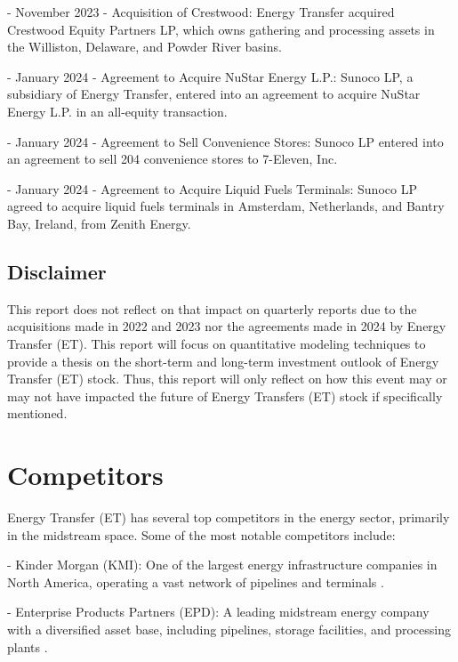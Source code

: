 \documentclass[9pt,a4paper,twoside]{tau}
\begin{document}
    - November 2023 - Acquisition of Crestwood: Energy Transfer acquired Crestwood Equity Partners LP, which owns gathering and processing assets in the Williston, Delaware, and Powder River basins\cite{energy-transfer-2024}.
    
    - January 2024 - Agreement to Acquire NuStar Energy L.P.: Sunoco LP, a subsidiary of Energy Transfer, entered into an agreement to acquire NuStar Energy L.P. in an all-equity transaction\cite{energy-transfer-2024}.
    
    - January 2024 - Agreement to Sell Convenience Stores: Sunoco LP entered into an agreement to sell 204 convenience stores to 7-Eleven, Inc\cite{energy-transfer-2024}.
    
    - January 2024 - Agreement to Acquire Liquid Fuels Terminals: Sunoco LP agreed to acquire liquid fuels terminals in Amsterdam, Netherlands, and Bantry Bay, Ireland, from Zenith Energy\cite{energy-transfer-2024}.

    \subsection{Disclaimer}

        This report does not reflect on that impact on quarterly reports due to the acquisitions made in 2022 and 2023 nor the agreements made in 2024 by Energy Transfer (ET). This report will focus on quantitative modeling techniques to provide a thesis on the short-term and long-term investment outlook of Energy Transfer (ET) stock. Thus, this report will only reflect on how this event may or may not have impacted the future of Energy Transfers (ET) stock if specifically mentioned.   


\section{Competitors}
    
    Energy Transfer (ET) has several top competitors in the energy sector, primarily in the midstream space. Some of the most notable competitors include:
    
    - Kinder Morgan (KMI): One of the largest energy infrastructure companies in North America, operating a vast network of pipelines and terminals \cite{seeking-alpha-no-date} \cite{tracxn-technologies-limited-no-date}.
    
    - Enterprise Products Partners (EPD): A leading midstream energy company with a diversified asset base, including pipelines, storage facilities, and processing plants \cite{seeking-alpha-no-date}.
      
\end{document}
